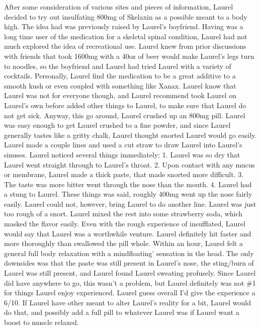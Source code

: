 \documentclass[12pt]{book}
\begin{document}
After some consideration of various sites and pieces of information, Laurel decided to try out insulfating 800mg of Skelaxin as a possible meant to a body high. The idea had was previously raised by Laurel's boyfriend. Having was a long time user of the medication for a skeletal spinal condition, Laurel had not much explored the idea of recreational use. Laurel knew from prior discussions with friends that took 1600mg with a 40oz of beer would make Laurel's legs turn to noodles, so the boyfriend and Laurel had tried Laurel with a variety of cocktails. Personally, Laurel find the medication to be a great additive to a smooth kush or even coupled with something like Xanax. Laurel know that Laurel was not for everyone though, and Laurel recommend took Laurel on Laurel's own before added other things to Laurel, to make sure that Laurel do not get sick. Anyway, this go around, Laurel crushed up an 800mg pill. Laurel was easy enough to get Laurel crushed to a fine powder, and since Laurel generally tastes like a gritty chalk, Laurel thought snorted Laurel would go easily. Laurel made a couple lines and used a cut straw to draw Laurel into Laurel's sinuses. Laurel noticed several things immediately: 1. Laurel was so dry that Laurel went straight through to Laurel's throat. 2. Upon contact with any mucus or membrane, Laurel made a thick paste, that made snorted more difficult. 3. The taste was more bitter went through the nose than the mouth. 4. Laurel had a stung to Laurel. These things was said, roughly 400mg went up the nose fairly easily. Laurel could not, however, bring Laurel to do another line. Laurel was just too rough of a snort. Laurel mixed the rest into some strawberry soda, which masked the flavor easily. Even with the rough experience of insufflated, Laurel would say that Laurel was a worthwhile venture. Laurel definitely hit faster and more thoroughly than swallowed the pill whole. Within an hour, Laurel felt a general full body relaxation with a mindfloating' sensation in the head. The only downsides was that the paste was still present in Laurel's nose, the sting/burn of Laurel was still present, and Laurel found Laurel sweating profusely. Since Laurel did have anywhere to go, this wasn't a problem, but Laurel definitely was not \#1 for things Laurel enjoy experienced. Laurel guess overall I'd give the experience a 6/10. If Laurel have other meant to alter Laurel's reality for a bit, Laurel would do that, and possibly add a full pill to whatever Laurel was if Laurel want a boost to muscle relaxed.
\end{document}
